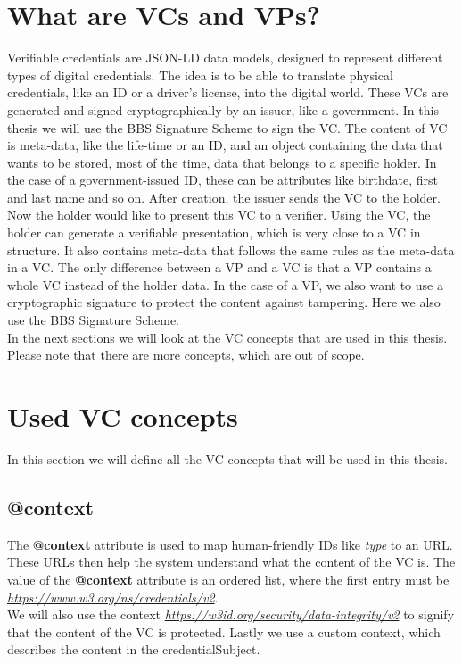 \documentclass[
	a4paper               %
	,BCOR=0mm            %
	,bibliography=totoc   %
	,listof=totoc         %
	,monolingual
	,twoside=false
]{bfhthesis}              %
\begin{document}
\section{What are VCs and VPs?}
Verifiable credentials\cite{verifiable-credentials} are JSON-LD data models, designed to represent different types of digital credentials.
The idea is to be able to translate physical credentials, like an ID or a driver's license, into the digital world.
These VCs are generated and signed cryptographically by an issuer, like a government.
In this thesis we will use the BBS Signature Scheme to sign the VC.
The content of VC is meta-data, like the life-time or an ID, and an object containing the data that wants to be stored, most of the time, data that belongs to a specific holder.
In the case of a government-issued ID, these can be attributes like birthdate, first and last name and so on.
After creation, the issuer sends the VC to the holder.\\

Now the holder would like to present this VC to a verifier.
Using the VC, the holder can generate a verifiable presentation\cite{verifiable-credentials}, which is very close to a VC in structure.
It also contains meta-data that follows the same rules as the meta-data in a VC.
The only difference between a VP and a VC is that a VP contains a whole VC instead of the holder data.
In the case of a VP, we also want to use a cryptographic signature to protect the content against tampering. Here we also use the BBS Signature Scheme.\\

In the next sections we will look at the VC concepts that are used in this thesis.
Please note that there are more concepts, which are out of scope.

\newpage
\section{Used VC concepts}
\label{sec:usedvcconcepts}
In this section we will define all the VC concepts that will be used in this thesis.

\subsection{@context}
The \textbf{@context} attribute is used to map human-friendly IDs like \textit{type} to an URL.
These URLs then help the system understand what the content of the VC is.
The value of the \textbf{@context} attribute is an ordered list, where the first entry must be \textit{\url{https://www.w3.org/ns/credentials/v2}}.\\
We will also use the context \textit{\url{https://w3id.org/security/data-integrity/v2}} to signify that the content of the VC is protected.
Lastly we use a custom context, which describes the content in the credentialSubject.
\end{document}
